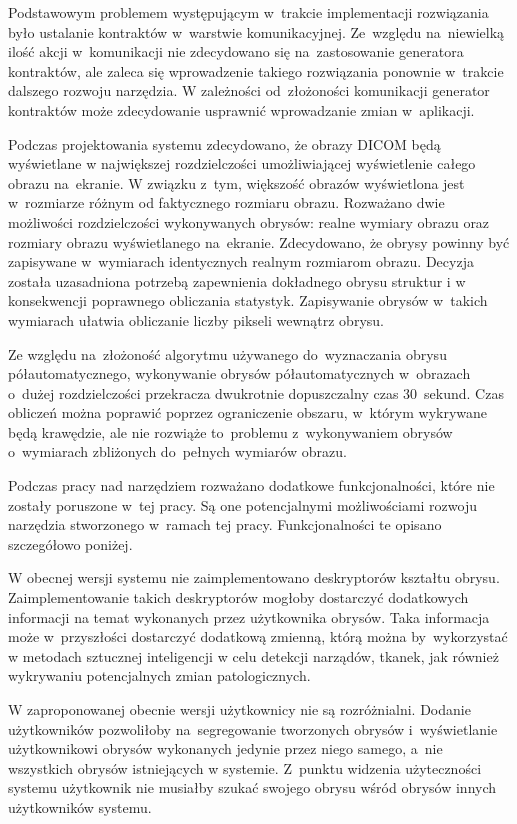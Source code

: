\documentclass[a4paper,11pt,twoside,openright]{report}
\theoremstyle{definition}
\begin{document}
Podstawowym problemem występującym w~trakcie implementacji rozwiązania było
ustalanie kontraktów w~warstwie komunikacyjnej. Ze~względu na~niewielką ilość
akcji w~komunikacji nie zdecydowano się na~zastosowanie generatora kontraktów,
ale zaleca się wprowadzenie takiego rozwiązania ponownie w~trakcie dalszego rozwoju narzędzia.
W zależności od~złożoności komunikacji generator kontraktów może zdecydowanie
usprawnić wprowadzanie zmian w~aplikacji.

Podczas projektowania systemu zdecydowano, że obrazy DICOM będą wyświetlane w
największej rozdzielczości umożliwiającej wyświetlenie całego obrazu na~ekranie.
W związku z~tym, większość obrazów wyświetlona jest w~rozmiarze różnym od
faktycznego rozmiaru obrazu. Rozważano dwie możliwości rozdzielczości wykonywanych
obrysów: realne wymiary obrazu oraz rozmiary obrazu wyświetlanego na~ekranie.
Zdecydowano, że obrysy powinny być zapisywane w~wymiarach identycznych realnym
rozmiarom obrazu. Decyzja została uzasadniona potrzebą zapewnienia dokładnego obrysu struktur i w konsekwencji poprawnego
obliczania statystyk. Zapisywanie obrysów w~takich wymiarach ułatwia obliczanie
liczby pikseli wewnątrz obrysu.

Ze względu na~złożoność algorytmu używanego do~wyznaczania obrysu półautomatycznego,
wykonywanie obrysów półautomatycznych w~obrazach o~dużej rozdzielczości przekracza
dwukrotnie dopuszczalny czas 30~sekund. Czas
obliczeń można poprawić poprzez ograniczenie obszaru, w~którym wykrywane będą
krawędzie, ale nie rozwiąże to~problemu z~wykonywaniem obrysów o~wymiarach
zbliżonych do~pełnych wymiarów obrazu.

Podczas pracy nad narzędziem rozważano dodatkowe funkcjonalności, które nie zostały
poruszone w~tej pracy. Są one potencjalnymi możliwościami rozwoju narzędzia
stworzonego w~ramach tej pracy. Funkcjonalności te opisano szczegółowo poniżej.

W obecnej wersji systemu nie zaimplementowano deskryptorów kształtu obrysu.
Zaimplementowanie takich deskryptorów mogłoby dostarczyć dodatkowych informacji
na temat wykonanych przez użytkownika obrysów. Taka informacja może w~przyszłości
dostarczyć dodatkową zmienną, którą można by~wykorzystać w metodach sztucznej
inteligencji w celu detekcji narządów, tkanek, jak również wykrywaniu potencjalnych zmian patologicznych.

W zaproponowanej obecnie wersji użytkownicy nie są rozróżnialni. Dodanie użytkowników
pozwoliłoby na~segregowanie tworzonych obrysów i~wyświetlanie użytkownikowi
obrysów wykonanych jedynie przez niego samego, a~nie wszystkich obrysów istniejących
w systemie. Z~punktu widzenia użyteczności systemu użytkownik nie musiałby szukać
swojego obrysu wśród obrysów innych użytkowników systemu.
\end{document}
